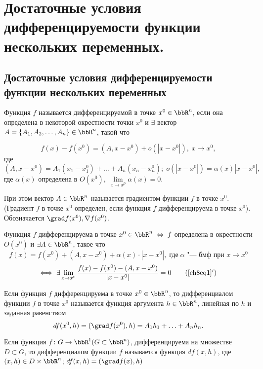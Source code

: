 \chapter[\texorpdfstring{Достаточные условия дифференцируемости функции не\-скольких переменных.}{Достаточные условия дифференцируемости функции нескольких переменных}]{Достаточные условия дифференцируемости функции нескольких переменных.}
\section[\texorpdfstring{Достаточные условия дифференцируемости функции \\несколь\-ких переменных.}{Достаточные условия дифференцируемости функции нескольких переменных}]{Достаточные условия дифференцируемости функции нескольких переменных}

\begin{defn}
Функция $f$ называется дифференцируемой в точке $x^0 \in \bbR^n$, если она определена в некоторой окрестности точки $x^0$ и $\exists$ вектор $A = \{ A_1,A_2,\dots,A_n\} \in \bbR^n$, такой что 

\begin{equation} \label{ch8eq1}
f(x) - f(x^0) = (A, x - x^0) + o(|x - x^0|), \; x \to x^0, 
\end{equation}
где $(A, x - x^0) = A_1(x_1 - x^0_1) + \ldots + A_n(x_n - x^0_n); \; o(|x - x^0|) = \alpha(x)|x - x^0|,$ где $\alpha(x)$ определена в $O(x^0), \; \lim\limits_{x \to x^0} \alpha(x) = 0$.

При этом вектор $A \in \bbR^n$ называется градиентом функции $f$ в точке $x^0$. (Градиент $f$ в точке $x^0$ определен, если функция $f$ дифференцируема в точке $x^0$). Обозначается $\grad f(x^0), \nabla f(x^0)$.

Функция $f$ дифференцируема в точке $x^0 \in \bbR^n \; \Leftrightarrow \; f$ определена в окрестности $O(x^0)$ и $\exists A \in \bbR^n$, такое что 
$$
f(x) = f(x^0) + (A, x - x^0) + \alpha(x) \cdot |x - x^0|, \; \textit{где} \; \alpha \text{ "--- бмф при } x \to x^0 
$$ 
\begin{equation} \label{ch8eq1'}
\Longleftrightarrow \; \exists \lim\limits_{x \to x^0} \frac{f(x) - f(x^0) - (A, x - x^0)}{|x - x^0|} = 0
\tag{\ref{ch8eq1}$'$}
\end{equation}
\end{defn}

\begin{defn}
Если функция $f$ дифференцируема в точке $x^0 \in \bbR^n$, то дифференциалом функции $f$ в точке $x^0$ называется функция аргумента $h \in \bbR^n$, линейная  по $h$ и заданная равенством
$$
df(x^0, h) = (\grad f(x^0), h) = A_1 h_1 + \ldots + A_n h_n.
$$

Если функция $f\colon G \to \bbR^1 (G \subset \bbR^n)$, дифференцируема на множестве $D \subset G$, то дифференциалом функции $f$ называется функция $df(x,h)$, где $(x,h) \in D \times \bbR^n$; $df(x,h) = (\grad f(x), h)$
\end{defn}

